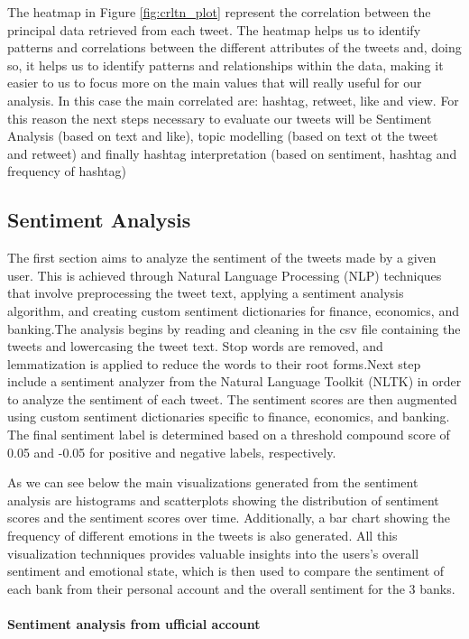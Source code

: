 \documentclass[fleqn,10pt]{SelfArx} %
\begin{document}
The heatmap in Figure \ref{fig:crltn_plot} represent the correlation between the principal data retrieved from each tweet. The heatmap helps us to identify patterns and correlations between the different attributes of the tweets and, doing so, it helps us to identify patterns and relationships within the data, making it easier to us to focus more on the main values that will really useful for our analysis. In this case the main correlated are: hashtag, retweet, like and view. For this reason the next steps necessary to evaluate our tweets will be Sentiment Analysis (based on text and like), topic modelling (based on text ot the tweet and retweet) and finally hashtag interpretation (based on sentiment, hashtag and frequency of hashtag)



\subsection{Sentiment Analysis}

The first section aims to analyze the sentiment of the tweets made by a given user. This is achieved through Natural Language Processing (NLP) techniques that involve preprocessing the tweet text, applying a sentiment analysis algorithm, and creating custom sentiment dictionaries for finance, economics, and banking.The analysis begins by reading and cleaning in the csv file containing the tweets and lowercasing the tweet text. Stop words are removed, and lemmatization is applied to reduce the words to their root forms.Next step include a sentiment analyzer from the Natural Language Toolkit (NLTK) in order to analyze the sentiment of each tweet. The sentiment scores are then augmented using custom sentiment dictionaries specific to finance, economics, and banking. The final sentiment label is determined based on a threshold compound score of 0.05 and -0.05 for positive and negative labels, respectively.

As we can see below the main visualizations generated from the sentiment analysis are histograms and scatterplots showing the distribution of sentiment scores and the sentiment scores over time. Additionally, a bar chart showing the frequency of different emotions in the tweets is also generated. All this visualization technniques provides valuable insights into the users's overall sentiment and emotional state, which is then used to compare the sentiment of each bank from their personal account and the overall sentiment for the 3 banks. 
\paragraph{Sentiment analysis from ufficial account}
\end{document}
